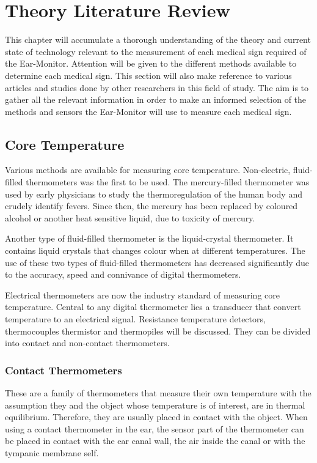 \chapter{Theory Literature Review}
\label{chp:TheoryLit}
This chapter will accumulate a thorough understanding of the theory and current state of technology relevant to the measurement of each medical sign required of the Ear-Monitor. Attention will be given to the different methods available to determine each medical sign. This section will also make reference to various articles and studies done by other researchers in this field of study. The aim is to gather all the relevant information in order to make an informed selection of the methods and sensors the Ear-Monitor will use to measure each medical sign.

\section{Core Temperature}
Various methods are available for measuring core temperature. Non-electric, fluid-filled thermometers was the first to be used. The mercury-filled thermometer was used by early physicians to study the thermoregulation of the human body and crudely identify fevers. Since then, the mercury has been replaced by coloured alcohol or another heat sensitive liquid, due to toxicity of mercury.

\medskip

Another type of fluid-filled thermometer is the liquid-crystal thermometer. It contains liquid crystals that changes colour when at different temperatures. The use of these two types of fluid-filled thermometers has decreased significantly due to the accuracy, speed and connivance of digital thermometers.

\medskip

Electrical thermometers are now the industry standard of measuring core temperature. Central to any digital thermometer lies a transducer that convert temperature to an electrical signal. Resistance temperature detectors, thermocouples thermistor and thermopiles will be discussed. They can be divided into contact and non-contact thermometers.

\subsection{Contact Thermometers}
These are a family of thermometers that measure their own temperature with the assumption they and the object whose temperature is of interest, are in thermal equilibrium. Therefore, they are usually placed in contact with the object. When using a contact thermometer in the ear, the sensor part of the thermometer can be placed in contact with the ear canal wall, the air inside the canal or with the tympanic membrane self.

